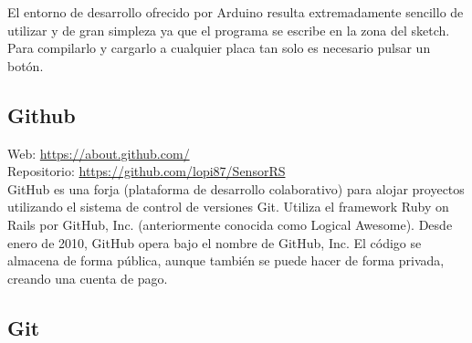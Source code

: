 El entorno de desarrollo ofrecido por Arduino resulta extremadamente sencillo de utilizar y de gran simpleza ya que el programa se escribe en la zona del sketch. Para compilarlo y
cargarlo a cualquier placa tan solo es necesario pulsar un botón.\\


\subsection{Github}


Web: \url{https://about.github.com/} \cite{website:2} \\
Repositorio: \url{https://github.com/lopi87/SensorRS}\\


GitHub es una forja (plataforma de desarrollo colaborativo) para alojar proyectos utilizando el sistema de control de versiones Git. Utiliza el framework Ruby on Rails por GitHub, Inc. (anteriormente conocida como Logical Awesome). Desde enero de 2010, GitHub opera bajo el nombre de GitHub, Inc. El código se almacena de forma pública, 
aunque también se puede hacer de forma privada, creando una cuenta de pago.\\

\subsection{Git}


